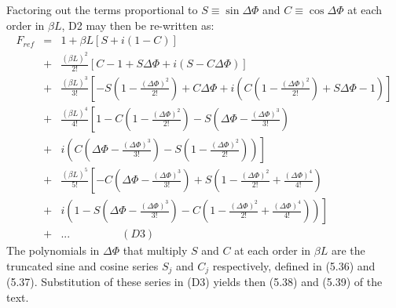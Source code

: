 {  \newpage

   Factoring out
  the terms proportional to $S \equiv \sin \Delta \Phi$ and $C \equiv \cos \Delta \Phi$ at each order in $\beta L$,
  D2 may then be re-written as:
  \begin{eqnarray}
 F_{ref} & = & 1+\beta L [S +i(1-C)] \nonumber \\
      & + & \frac{(\beta L)^2}{2!} \left[C-1+S\Delta \Phi+i(S-C \Delta \Phi)\right] \nonumber \\
      & + &  \frac{(\beta L)^3}{3!} \left[-S(1-\frac{(\Delta \Phi)^2}{2!})+C\Delta \Phi 
             +i\left(C(1-\frac{(\Delta \Phi)^2}{2!})+S\Delta \Phi-1\right)\right]   \nonumber \\
      & + &  \frac{(\beta L)^4}{4!}\left[1-C(1-\frac{(\Delta \Phi)^2}{2!})-S(\Delta \Phi-\frac{(\Delta \Phi)^3}{3!})
               \right.  \nonumber \\
      & + & \left. i \left(C(\Delta \Phi-\frac{(\Delta \Phi)^3}{3!})-S(1-\frac{(\Delta \Phi)^2}{2!})\right) \right] \nonumber \\
     & + &  \frac{(\beta L)^5}{5!}\left[-C(\Delta \Phi-\frac{(\Delta \Phi)^3}{3!})+S(1-\frac{(\Delta \Phi)^2}{2!}
     + \frac{(\Delta \Phi)^4}{4!}) \right.  \nonumber \\
      & + & \left. i \left(1-S(\Delta \Phi-\frac{(\Delta \Phi)^3}{3!})-C(1-\frac{(\Delta \Phi)^2}{2!}
      + \frac{(\Delta \Phi)^4}{4!})\right)\right]  \nonumber \\
     & + &... \nonumber ~~~~~~~~~~~~~~~~~~~~~(D3)
 \end{eqnarray}
  The polynomials in $\Delta \Phi$ that multiply $S$ and
    $C$ at each order in $\beta L$ are the truncated sine and cosine series
    $S_j$ and $C_j$ respectively, defined in (5.36) and (5.37).
    Substitution of these series in (D3) yields then (5.38) and (5.39) of the text.

}
